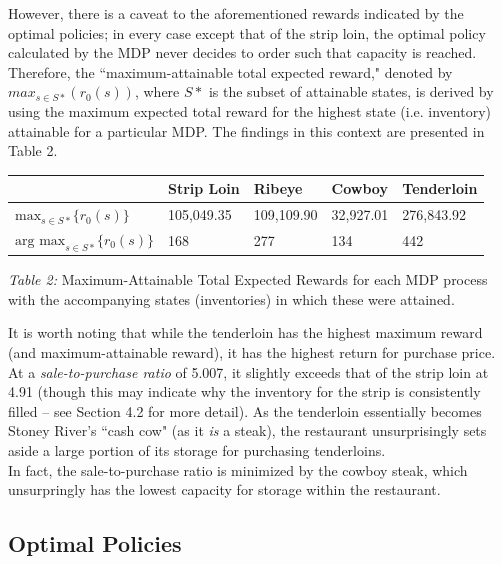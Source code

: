 \documentclass[12pt,a4paper]{article}
\begin{document}
However, there is a caveat to the aforementioned rewards indicated by the optimal policies; in every case except that of the strip loin, the optimal policy calculated by the MDP never decides to order such that capacity is reached. Therefore, the ``maximum-attainable total expected reward," denoted by $max_{s \in S*} (r_{0}(s))$, where $S*$ is the subset of attainable states, is derived by using the maximum expected total reward for the highest state (i.e. inventory) attainable for a particular MDP. The findings in this context are presented in Table 2.

\begin{table}[!ht]
    \centering
    \begin{tabular}{|l|l|l|l|l|}
    \hline
        ~ & Strip Loin & Ribeye & Cowboy & Tenderloin \\ \hline
        $\text{max}_{s \in S*} \{ r_{0} (s) \}$ & 105,049.35 & 109,109.90 & 32,927.01 & 276,843.92 \\ \hline
        $\text{arg max}_{s \in S*} \{ r_{0}(s) \} $ & 168 & 277 & 134 & 442 \\ \hline
    \end{tabular}
\end{table}
\small 
\begin{center}
\textit{Table 2:} Maximum-Attainable Total Expected Rewards for each MDP process with the accompanying states (inventories) in which these were attained.
\end{center}
\normalsize

It is worth noting that while the tenderloin has the highest maximum reward (and maximum-attainable reward), it has the highest return for purchase price. At a \textit{sale-to-purchase ratio} of 5.007, it slightly exceeds that of the strip loin at 4.91 (though this may indicate why the inventory for the strip is consistently filled -- see Section 4.2 for more detail). As the tenderloin essentially becomes Stoney River's ``cash cow" (as it \textit{is} a steak), the restaurant unsurprisingly sets aside a large portion of its storage for purchasing tenderloins. 
\\

In fact, the sale-to-purchase ratio is minimized by the cowboy steak, which unsurpringly has the lowest capacity for storage within the restaurant.

\subsection{Optimal Policies}
\end{document}
